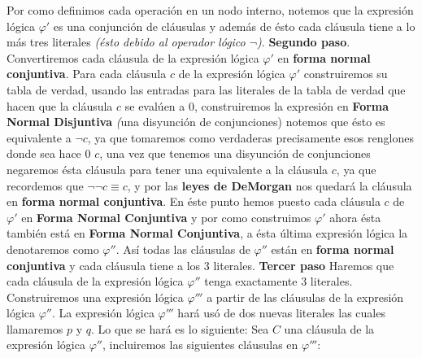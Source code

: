 \documentclass[a4paper]{article}
\begin{document}
\newline
Por como definimos cada operación en un nodo interno, notemos que la expresión lógica \(\varphi'\) es una conjunción de cláusulas y además de ésto
cada cláusula tiene a lo más tres literales \textit{(ésto debido al operador lógico \(\neg\))}.
\newline 
\textbf{Segundo paso}.
\newline 
Convertiremos cada cláusula de la expresión lógica \(\varphi'\) en \textbf{forma normal conjuntiva}. Para cada cláusula \(c\) de la expresión 
lógica \(\varphi'\) construiremos su tabla de verdad, usando las entradas para las literales de la tabla de verdad que hacen que la cláusula \(c\)
se evalúen a \(0\), construiremos la expresión en \textbf{Forma Normal Disjuntiva} \textit(una disyunción de conjunciones) notemos que ésto es equivalente a 
\(\neg c\), ya que tomaremos como verdaderas precisamente esos renglones donde sea hace \(0\) \(c\), una vez que tenemos una disyunción de conjunciones negaremos 
ésta cláusula para tener una equivalente a la cláusula \(c\), ya que recordemos que \(\neg \neg c \equiv c\), y por las \textbf{leyes de DeMorgan} nos 
quedará la cláusula en \textbf{forma normal conjuntiva}. En éste punto hemos puesto cada cláusula \(c\) de \(\varphi'\) en \textbf{Forma Normal Conjuntiva}
y por como construimos \(\varphi'\) ahora ésta también está en \textbf{Forma Normal Conjuntiva}, a ésta última expresión lógica la denotaremos como \(\varphi''\).
Así todas las cláusulas de \(\varphi''\) están en \textbf{forma normal conjuntiva} y cada cláusula tiene a los \(3\) literales.
\newline 
\textbf{Tercer paso}
\newline 
Haremos que cada cláusula de la expresión lógica \(\varphi''\) tenga exactamente \(3\) literales. Construiremos una expresión lógica
\(\varphi'''\) a partir de las cláusulas de la expresión lógica \(\varphi''\). La expresión lógica \(\varphi'''\) hará usó de dos nuevas 
literales las cuales llamaremos \(p\) y \(q\). Lo que se hará es lo siguiente:
Sea \(C\) una cláusula de la expresión lógica \(\varphi''\), incluiremos las siguientes cláusulas en \(\varphi'''\):
\end{document}
